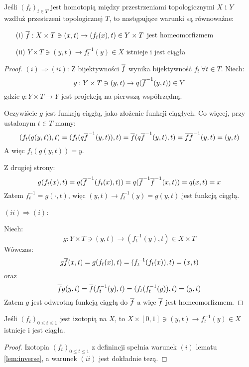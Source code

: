 \begin{lem} \label{lem:inverse}
  Jeśli $(f_t)_{t \in T}$ jest homotopią między przestrzeniami topologicznymi $X$ i $Y$ wzdłuż przestrzeni topologicznej $T$, to następujące warunki są równoważne:
  \begin{enumerate}
   \item[(i)] $\overline{f}: X \times T \ni (x, t) \rightarrow (f_t(x), t) \in Y \times T$ jest homeomorfizmem
   \item[(ii)] $Y \times T \ni (y, t) \rightarrow f_t^{-1}(y) \in X$ istnieje i jest ciągła
  \end{enumerate}
  
  \begin{proof}
    $(i) \Rightarrow (ii)$:
    Z bijektywności $\overline{f}$ wynika bijektywność $f_t\ \forall t \in T$.
    Niech:
    \[
      g: Y \times T \ni (y, t) \rightarrow q(\overline{f}^{-1}(y, t)) \in Y
    \]
    gdzie $q: Y \times T \to Y$ jest projekcją na pierwszą współrzędną.
    
    Oczywiście $g$ jest funkcją ciągłą, jako złożenie funkcji ciągłych.
    Co więcej, przy ustalonym $t \in T$ mamy:
    \[
      (f_t(g(y,t)), t) = (f_t(q \overline{f}^{-1}(y,t)), t) = \overline{f}(q \overline{f}^{-1}(y,t), t) = \overline{f} \overline{f}^{-1}(y,t) = (y,t)
    \]
    A więc $f_t(g(y,t)) = y$.
    
    Z drugiej strony:
    \[
      g(f_t(x),t) = q(\overline{f}^{-1}(f_t(x),t)) = q(\overline{f}^{-1} \overline{f}^{-1}(x,t)) = q(x,t) = x
    \]
    Zatem $f_t^{-1} = g(\cdot,t)$, więc $(y,t) \to f_t^{-1}(y) = g(y, t)$ jest funkcją ciągłą.
    
    $(ii) \Rightarrow (i)$:
    
    Niech:
    \[
      g: Y \times T \ni (y, t) \rightarrow (f_t^{-1}(y), t) \in X \times T
    \]
    Wówczas:
    \[
      g\overline{f}(x,t) = g(f_t(x), t) = (f_t^{-1}(f_t(x)), t) = (x,t)
    \]
    oraz
    \[
      \overline{f}g(y,t) = \overline{f}(f_t^{-1}(y), t) = (f_t(f_t^{-1}(y)), t) = (y,t)
    \]
    Zatem $g$ jest odwrotną funkcją ciągłą do $\overline{f}$ a więc $\overline{f}$ jest homeomorfizmem.
  \end{proof}
\end{lem}


\begin{cor} \label{cor:isotopy-inverse}
  Jeśli $(f_t)_{0 \leq t \leq 1}$ jest izotopią na $X$, to $X \times [0,1] \ni (y, t) \rightarrow f_t^{-1}(y) \in X$ istnieje i jest ciągła.
  \begin{proof}
    Izotopia $(f_t)_{0 \leq t \leq 1}$ z definincji spełnia warunek $(i)$ lematu \ref{lem:inverse}, a warunek $(ii)$ jest dokładnie tezą.
  \end{proof}
\end{cor}

